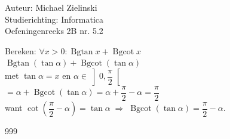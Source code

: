 \documentclass[a4paper]{article}
\newcommand{\Bgcot}{\operatorname{Bgcot}}
\newcommand{\Bgtan}{\operatorname{Bgtan}}
\begin{document}
\noindent \large Auteur: Michael Zielinski\\
\noindent \large Studierichting: Informatica\\
\noindent \large Oefeningenreeks 2B nr. 5.2\\

\medskip
\normalsize

Bereken: $\forall x>0: \Bgtan x+\Bgcot x$\\[6pt]

$\Bgtan\left(\tan\alpha\right)+\Bgcot\left(\tan\alpha\right)$\\

met $\tan\alpha=x$ en $\alpha\in\left]0,\dfrac{\pi}{2}\right[$\\

$=\alpha+\Bgcot\left(\tan\alpha\right)
   =\alpha+\dfrac{\pi}{2}-\alpha
   =\dfrac{\pi}{2}$\\

want $\cot\!\left(\dfrac{\pi}{2}-\alpha\right)=\tan\alpha
      \;\Longrightarrow\;
      \Bgcot\left(\tan\alpha\right)=\dfrac{\pi}{2}-\alpha$.\\

\begin{thebibliography}{999}
\end{thebibliography}
\end{document}
